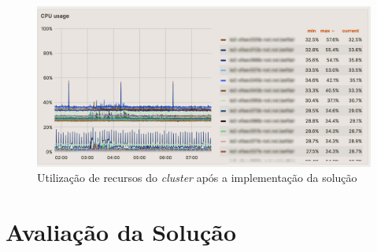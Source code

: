 \begin{figure}[H]
  \centerline{\includegraphics[scale=0.5]{media/content/impl/grafana-after.png}}
  \caption{Utilização de recursos do \textit{cluster} após a implementação da solução}
  \label{usage-after}
\end{figure}

\section{Avaliação da Solução}


